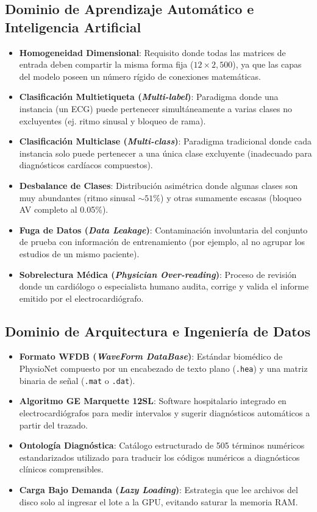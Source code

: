 \documentclass[11pt,a4paper]{article}
\begin{document}
\subsection{Dominio de Aprendizaje Automático e Inteligencia Artificial}
\begin{itemize}[topsep=1pt, itemsep=1pt, parsep=0pt]
    \item \textbf{Homogeneidad Dimensional}: Requisito donde todas las matrices de entrada deben compartir la misma forma fija ($12 \times 2{,}500$), ya que las capas del modelo poseen un número rígido de conexiones matemáticas.
    \item \textbf{Clasificación Multietiqueta (\textit{Multi-label})}: Paradigma donde una instancia (un ECG) puede pertenecer simultáneamente a varias clases no excluyentes (ej. ritmo sinusal y bloqueo de rama).
    \item \textbf{Clasificación Multiclase (\textit{Multi-class})}: Paradigma tradicional donde cada instancia solo puede pertenecer a una única clase excluyente (inadecuado para diagnósticos cardíacos compuestos).
    \item \textbf{Desbalance de Clases}: Distribución asimétrica donde algunas clases son muy abundantes (ritmo sinusal $\sim 51\%$) y otras sumamente escasas (bloqueo AV completo al 0.05\%).
    \item \textbf{Fuga de Datos (\textit{Data Leakage})}: Contaminación involuntaria del conjunto de prueba con información de entrenamiento (por ejemplo, al no agrupar los estudios de un mismo paciente).
    \item \textbf{Sobrelectura Médica (\textit{Physician Over-reading})}: Proceso de revisión donde un cardiólogo o especialista humano audita, corrige y valida el informe emitido por el electrocardiógrafo.
\end{itemize}

\subsection{Dominio de Arquitectura e Ingeniería de Datos}
\begin{itemize}[topsep=1pt, itemsep=1pt, parsep=0pt]
    \item \textbf{Formato WFDB (\textit{WaveForm DataBase})}: Estándar biomédico de PhysioNet compuesto por un encabezado de texto plano (\texttt{.hea}) y una matriz binaria de señal (\texttt{.mat} o \texttt{.dat}).
    \item \textbf{Algoritmo GE Marquette 12SL}: Software hospitalario integrado en electrocardiógrafos para medir intervalos y sugerir diagnósticos automáticos a partir del trazado.
    \item \textbf{Ontología Diagnóstica}: Catálogo estructurado de 505 términos numéricos estandarizados utilizado para traducir los códigos numéricos a diagnósticos clínicos comprensibles.
    \item \textbf{Carga Bajo Demanda (\textit{Lazy Loading})}: Estrategia que lee archivos del disco solo al ingresar el lote a la GPU, evitando saturar la memoria RAM.
\end{itemize}
\newpage
\end{document}
